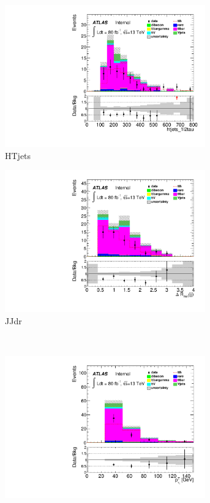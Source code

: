\begin{figure}[h]\ContinuedFloat
\centering
\begin{subfigure}[b]{0.45\textwidth}
 \includegraphics[width=0.95\textwidth,angle=-90]{fig/OneL2taulowBDTOS/htjets_1l2tau_F.pdf}
 \caption{HTjets}
\end{subfigure}
\begin{subfigure}[b]{0.45\textwidth}
 \includegraphics[width=0.95\textwidth,angle=-90]{fig/OneL2taulowBDTOS/jjdrmin_1l2tau_F.pdf}
 \caption{JJdr}
\end{subfigure}\\
\begin{subfigure}[b]{0.45\textwidth}
 \includegraphics[width=0.95\textwidth,angle=-90]{fig/OneL2taulowBDTOS/tau_pt_0_F.pdf}

\end{subfigure}
\end{figure}
